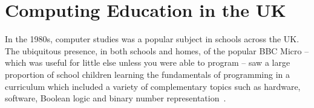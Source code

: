 \documentclass{sig-alternate}
\begin{document}

\section{Computing Education in the UK}\label{compedu}

In the 1980s, computer studies was a popular subject in schools across
the UK. The ubiquitous presence, in both
schools and homes, of the popular BBC Micro -- which was useful for
little else unless you were able to program -- saw a large proportion
of school children learning the fundamentals of programming in a
curriculum which included a variety of complementary topics such as
hardware, software, Boolean logic and binary number
representation~\cite{Doyle:1988}.
\end{document}
